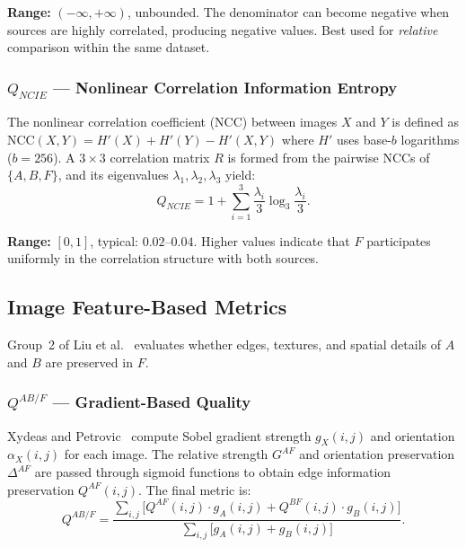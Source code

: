 \documentclass[a4paper,12pt]{article}
\begin{document}
\textbf{Range:} $(-\infty, +\infty)$, unbounded.
The denominator can become negative when sources are highly correlated,
producing negative values. Best used for \emph{relative} comparison within the
same dataset.

\subsubsection{$Q_{NCIE}$ --- Nonlinear Correlation Information Entropy}

The nonlinear correlation coefficient (NCC) between images $X$ and $Y$ is defined
as $\text{NCC}(X,Y) = H'(X) + H'(Y) - H'(X,Y)$ where $H'$ uses base-$b$
logarithms ($b=256$). A $3 \times 3$ correlation matrix $R$ is formed from the
pairwise NCCs of $\{A, B, F\}$, and its eigenvalues $\lambda_1, \lambda_2, \lambda_3$
yield:
\begin{equation}
  Q_{NCIE} = 1 + \sum_{i=1}^{3} \frac{\lambda_i}{3} \log_3 \frac{\lambda_i}{3}.
\end{equation}

\textbf{Range:} $[0,1]$, typical: $0.02$--$0.04$.
Higher values indicate that $F$ participates uniformly in the correlation
structure with both sources.

\subsection{Image Feature-Based Metrics}

Group~2 of Liu et al.~\cite{liu2012} evaluates whether edges, textures, and
spatial details of $A$ and $B$ are preserved in $F$.

\subsubsection{$Q^{AB/F}$ --- Gradient-Based Quality}

Xydeas and Petrovic~\cite{xydeas2000} compute Sobel gradient strength
$g_X(i,j)$ and orientation $\alpha_X(i,j)$ for each image. The relative
strength $G^{AF}$ and orientation preservation $\Delta^{AF}$ are passed through
sigmoid functions to obtain edge information preservation $Q^{AF}(i,j)$.
The final metric is:
\begin{equation}
  Q^{AB/F} = \frac{\sum_{i,j}\bigl[Q^{AF}(i,j) \cdot g_A(i,j) + Q^{BF}(i,j) \cdot g_B(i,j)\bigr]}
             {\sum_{i,j}\bigl[g_A(i,j) + g_B(i,j)\bigr]}.
\end{equation}
\end{document}
